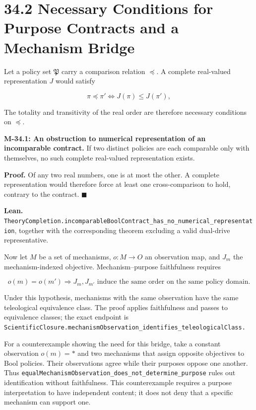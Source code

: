 \documentclass[
  english,
  11pt,
  oneside]{book}
\begin{document}
\section{34.2 Necessary Conditions for Purpose Contracts and a Mechanism Bridge}\label{necessary-conditions-for-purpose-contracts-and-a-mechanism-bridge}

Let a policy set \(\mathfrak P\) carry a comparison relation \(\preceq\). A complete real-valued representation \(J\) would satisfy

\[\pi\preceq\pi'\iff J(\pi)\le J(\pi'),\]

The totality and transitivity of the real order are therefore necessary conditions on \(\preceq\).

\hypertarget{m-34-1}{}\label{m-34-1}

\textbf{M-34.1: An obstruction to numerical representation of an incomparable contract.} If two distinct policies are each comparable only with themselves, no such complete real-valued representation exists.

\textbf{Proof.} Of any two real numbers, one is at most the other. A complete representation would therefore force at least one cross-comparison to hold, contrary to the contract. \(\blacksquare\)

\textbf{Lean.} \nolinkurl{TheoryCompletion.incomparableBoolContract_has_no_numerical_representation}, together with the corresponding theorem excluding a valid dual-drive representative.

Now let \(M\) be a set of mechanisms, \(o:M\to O\) an observation map, and \(J_m\) the mechanism-indexed objective. Mechanism--purpose faithfulness requires

\[o(m)=o(m')\Longrightarrow J_m,J_{m'}\text{ induce the same order on the same policy domain}.\]

Under this hypothesis, mechanisms with the same observation have the same teleological equivalence class. The proof applies faithfulness and passes to equivalence classes; the exact endpoint is \nolinkurl{ScientificClosure.mechanismObservation_identifies_teleologicalClass.}

For a counterexample showing the need for this bridge, take a constant observation \(o(m)=*\) and two mechanisms that assign opposite objectives to Bool policies. Their observations agree while their purposes oppose one another. Thus \nolinkurl{equalMechanismObservation_does_not_determine_purpose} rules out identification without faithfulness. This counterexample requires a purpose interpretation to have independent content; it does not deny that a specific mechanism can support one.
\end{document}
